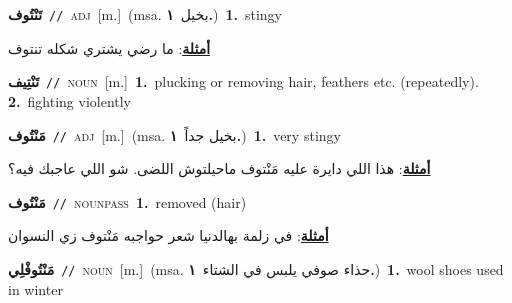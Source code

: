 \documentclass[10pt,a4paper,twoside]{article} %
\begin{document}
\begin{multicols}{2}
{\setlength\topsep{0pt}\textbf{\foreignlanguage{arabic}{تَنْتُوف}}\ {\color{gray}\texttt{//}\color{black}}\ \textsc{adj}\ [m.]\ \color{gray}(msa. \foreignlanguage{arabic}{بخيل}~\foreignlanguage{arabic}{\textbf{١.}})\color{black}\ \textbf{1.}~stingy\  \begin{flushright}\color{gray}\foreignlanguage{arabic}{\textbf{\underline{\foreignlanguage{arabic}{أمثلة}}}: ما رضي يشتري شكله تنتوف}\end{flushright}\color{black}} \vspace{2mm}

{\setlength\topsep{0pt}\textbf{\foreignlanguage{arabic}{تَنْتِيف}}\ {\color{gray}\texttt{//}\color{black}}\ \textsc{noun}\ [m.]\ \textbf{1.}~plucking or removing hair, feathers etc. (repeatedly).  \textbf{2.}~fighting violently\ } \vspace{2mm}

{\setlength\topsep{0pt}\textbf{\foreignlanguage{arabic}{مَنْتُوف}}\ {\color{gray}\texttt{//}\color{black}}\ \textsc{adj}\ [m.]\ \color{gray}(msa. \foreignlanguage{arabic}{بخيل جداً}~\foreignlanguage{arabic}{\textbf{١.}})\color{black}\ \textbf{1.}~very stingy\  \begin{flushright}\color{gray}\foreignlanguage{arabic}{\textbf{\underline{\foreignlanguage{arabic}{أمثلة}}}: هذا اللي دايرة عليه مَنْتوف ماحيلتوش اللضى. شو اللي عاجبك فيه؟}\end{flushright}\color{black}} \vspace{2mm}

{\setlength\topsep{0pt}\textbf{\foreignlanguage{arabic}{مَنْتُوف}}\ {\color{gray}\texttt{//}\color{black}}\ \textsc{noun\textunderscore pass}\ \textbf{1.}~removed (hair)\  \begin{flushright}\color{gray}\foreignlanguage{arabic}{\textbf{\underline{\foreignlanguage{arabic}{أمثلة}}}: في زلمة بهالدنيا شعر حواجبه مَنْتوف زي النسوان}\end{flushright}\color{black}} \vspace{2mm}

{\setlength\topsep{0pt}\textbf{\foreignlanguage{arabic}{مَنْتُوفْلِي}}\ {\color{gray}\texttt{//}\color{black}}\ \textsc{noun}\ [m.]\ \color{gray}(msa. \foreignlanguage{arabic}{حذاء صوفي يلبس في الشتاء}~\foreignlanguage{arabic}{\textbf{١.}})\color{black}\ \textbf{1.}~wool shoes used in winter\ } \vspace{2mm}


\end{multicols}
\end{document}
